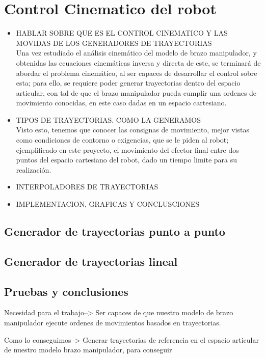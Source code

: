 \section{Control Cinematico del robot}
\begin{itemize}
	\item HABLAR SOBRE QUE ES EL CONTROL CINEMATICO Y LAS MOVIDAS DE LOS GENERADORES DE TRAYECTORIAS
\\Una vez estudiado el análisis cinemático del modelo de brazo manipulador, y obtenidas las ecuaciones cinemáticas inversa y directa de este, se terminará de abordar el problema cinemático, al ser capaces de desarrollar el control sobre esta; para ello, se requiere poder generar trayectorias dentro del espacio articular, con tal de que el brazo manipulador pueda cumplir una ordenes de movimiento conocidas, en este caso dadas en un espacio cartesiano.\\

\item TIPOS DE TRAYECTORIAS. COMO LA GENERAMOS
\\Visto esto, tenemos que conocer las consignas de movimiento, mejor vistas como condiciones de contorno o exigencias, que se le piden al robot; ejemplificado en este proyecto, el movimiento del efector final entre dos puntos del espacio cartesiano del robot, dado un tiempo limite para su realización.\\

	\item INTERPOLADORES DE TRAYECTORIAS
	\item IMPLEMENTACION, GRAFICAS Y CONCLUSCIONES 
\end{itemize}
	\subsection{Generador de trayectorias punto a punto}
	 
	\subsection{Generador de trayectorias lineal}
	\subsection{Pruebas y conclusiones}
		Necesidad para el trabajo-->
		 Ser capaces de que nuestro modelo de brazo manipulador ejecute ordenes de movimientos basados en trayectorias.
		  
	    Como lo conseguimos-->
	   		Generar trayectorias de referencia en el espacio articular de nuestro modelo brazo manipulador, para conseguir